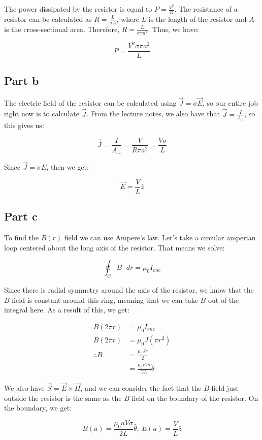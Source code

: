 \documentclass{article}
\theoremstyle{definition}
\numberwithin{equation}{section}
\numberwithin{definition}{section}
\begin{document}
The power dissipated by the resistor is equal to $P = \frac{V^2}{R}$. The resistance of a resistor can be calculated as $R = \frac{L}{\sigma A}$, where $L$ is the length of the resistor and $A$ is the cross-sectional area. Therefore, $R = \frac{L}{\sigma \pi a^2}$. Thus, we have:

\[ P = \frac{V^2 \sigma \pi a^2}{L}\]

\subsection*{Part b}

The electric field of the resistor can be calculated using $\vec{J} = \sigma \vec{E}$, so our entire job right now is to calculate $\vec{J}$. From the lecture notes, we also have that $\vec{J} = \frac{I}{A_\perp}$, so this gives us: 

\[ \vec J = \frac{I}{A_\perp} = \frac{V}{R\pi a^2} = \frac{V\sigma}{L}\]

Since $\vec J = \sigma E$, then we get:

\[ \vec E = \frac{V}{L} \hat z\]


\subsection*{Part c}

To find the $B(r)$ field we can use Ampere's law. Let's take a circular amperian loop centered about the long axis of the resistor. That means we solve:


\[ \oint_C B \cdot dr = \mu_0 I_{enc}\]

Since there is radial symmetry around the axis of the resistor, we know that the $B$ field is constant around this ring, meaning that we can take $B$ out of the integral here. As a result of this, we get:

\begin{align*}
    B (2\pi r) &= \mu_0 I_{enc} \\
    B(2\pi r) &= \mu_0 J(\pi r^2)\\
    \therefore B &= \frac{\mu_0 J r}{2}\\
    &= \frac{\mu_0 r V\sigma}{2L} \hat \theta
\end{align*}

We also have $\vec{S} = \vec{E} \times \vec{H}$, and we can consider the fact that the $B$ field just outside the resistor is the same as the $B$ field on the boundary of the resistor. On the boundary, we get:

\[ B(a) = \frac{\mu_0 a V\sigma}{2L} \hat \theta, \ E(a) = \frac{V}{L} \hat z\]
\end{document}
